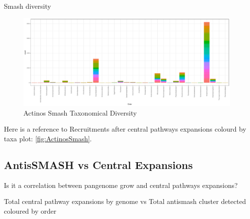 \documentclass[12pt,twoside]{reedthesis}
\begin{document}
  Smash diversity
  
  \begin{figure}[h!tbp]
  \centering
  \includegraphics[angle = 0,scale = 0.5]{chapter2/Actinobacteria/ActinosSmash.pdf}
  \caption[Actinos Smash Taxonomical Diversity]{\normalsize{Actinos Smash Taxonomical Diversity}}
  \label{fig:ActinosSmash}
  \end{figure}
  
  Here is a reference to Recruitments after central pathways expansions
  colourd by taxa plot: \autoref{fig:ActinosSmash}. \clearpage
  
  \subsection{AntisSMASH vs Central
  Expansions}\label{antissmash-vs-central-expansions-1}
  
  Is it a correlation between pangenome grow and central pathways
  expansions?
  
  Total central pathway expansions by genome vs Total antismash cluster
  detected coloured by order
  
\end{document}
